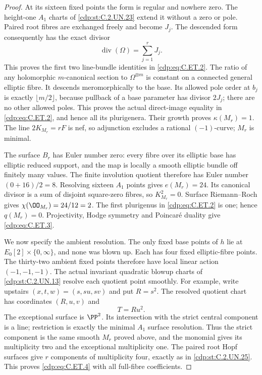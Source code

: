 \begin{proof}
At its sixteen fixed points the form
is regular and nowhere zero. The
height-one $A_1$ charts of \ref{cdp:st:C.2.UN.23}
extend it without a zero or pole.
Paired root fibres are exchanged
freely and become $J_j$. The
descended form consequently has
the exact divisor
\[
                      \operatorname{div}(\Omega)
                                      =\sum_{j=1}^rJ_j .
                                                               \tag{C.ET.10}\label{cdp:eq:C.ET.10}
\]
This proves the first two line-bundle
identities in \eqref{cdp:eq:C.ET.2}.
The ratio of any holomorphic
$m$-canonical section to
$\Omega^{\otimes m}$ is constant
on a connected general elliptic
fibre. It descends meromorphically
to the base. Its allowed pole
order at $b_j$ is exactly
$\lfloor m/2\rfloor$, because
pullback of a base parameter
has divisor $2J_j$; there are
no other allowed poles.
This proves the actual direct-image
equality in \eqref{cdp:eq:C.ET.2}, and hence
all its plurigenera.
Their growth proves $\kappa(M_r)=1$.
The line $2K_{M_r}=rF$ is nef,
so adjunction excludes a rational
$(-1)$-curve; $M_r$ is minimal.

The surface $B_r$ has Euler number
zero: every fibre over its elliptic
base has elliptic reduced support,
and the map is locally a smooth
elliptic bundle off finitely many
values. The finite involution
quotient therefore has Euler
number $(0+16)/2=8$. Resolving
sixteen $A_1$ points gives
$e(M_r)=24$. Its canonical
divisor is a sum of disjoint
square-zero fibres, so
$K_{M_r}^2=0$. Surface
Riemann--Roch gives
$\chi(\OO_{M_r})=24/12=2$.
The first plurigenus in \eqref{cdp:eq:C.ET.2}
is one; hence $q(M_r)=0$.
Projectivity, Hodge symmetry and
Poincar\'e duality give \eqref{cdp:eq:C.ET.3}.

We now specify the ambient resolution.
The only fixed base points of
$h$ lie at $E_0[2]\times\{0,\infty\}$,
and none was blown up. Each has
four fixed elliptic-fibre points.
The thirty-two ambient fixed
points therefore have local
linear action $(-1,-1,-1)$.
The actual invariant quadratic
blowup charts of \ref{cdp:st:C.2.UN.13} resolve
each quotient point smoothly.
For example, write upstairs
$(x,t,w)=(s,su,sv)$ and put
$R=s^2$. The resolved quotient
chart has coordinates $(R,u,v)$
and
\[
                              T=Ru^2 .                \tag{C.ET.11}\label{cdp:eq:C.ET.11}
\]
The exceptional surface is $\PP^2$.
Its intersection with the strict
central component is a line;
restriction is exactly the
minimal $A_1$ surface resolution.
Thus the strict component is
the same smooth $M_r$ proved
above, and the monomial gives
its multiplicity two and the
exceptional multiplicity one.
The paired root Hopf surfaces
give $r$ components of
multiplicity four, exactly as
in \ref{cdp:st:C.2.UN.25}. This proves \eqref{cdp:eq:C.ET.4}
with all full-fibre coefficients.


\end{proof}
